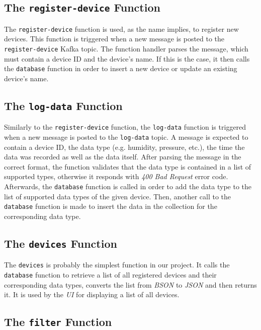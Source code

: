 \subsection{The \texttt{register-device} Function}

The \texttt{register-device} function is used, as the name implies, to register new devices. This
function is triggered when a new message is posted to the \\
\texttt{register-device} Kafka topic. The function handler parses the message, which must contain a
device ID and the device's name. If this is the case, it then calls the \texttt{database} function
in order to insert a new device or update an existing device's name.

\subsection{The \texttt{log-data} Function}

Similarly to the \texttt{register-device} function, the \texttt{log-data} function is triggered when
a new message is posted to the \texttt{log-data} topic. A message is expected to contain a device
ID, the data type (e.g. humidity, pressure, etc.), the time the data was recorded as well as the
data itself. After parsing the message in the correct format, the function validates that the data
type is contained in a list of supported types, otherwise it responds with \textit{400 Bad Request}
error code. Afterwards, the \texttt{database} function is called in order to add the data type to
the list of supported data types of the given device. Then, another call to the \texttt{database}
function is made to insert the data in the collection for the corresponding data type.

\subsection{The \texttt{devices} Function}

The \texttt{devices} is probably the simplest function in our project. It calls the
\texttt{database} function to retrieve a list of all registered devices and their corresponding data
types, converts the list from \textit{BSON} to \textit{JSON} and then returns it. It is used by the
\textit{UI} for displaying a list of all devices.

\subsection{The \texttt{filter} Function}

